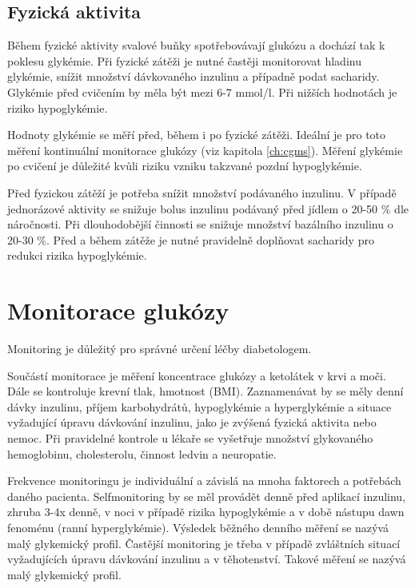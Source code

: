 \subsection{Fyzická aktivita}

Během fyzické aktivity svalové buňky spotřebovávají glukózu a dochází tak k poklesu glykémie. Při fyzické zátěži je nutné častěji monitorovat hladinu glykémie, snížit množství dávkovaného inzulinu a případně podat sacharidy. Glykémie před cvičením by měla být mezi 6-7 mmol/l. Při nižších hodnotách je riziko hypoglykémie.

Hodnoty glykémie se měří před, během i po fyzické zátěži. Ideální je pro toto měření kontinuální monitorace glukózy (viz kapitola \ref{ch:cgms}). Měření glykémie po cvičení je důležité kvůli riziku vzniku takzvané pozdní hypoglykémie.

Před fyzickou zátěží je potřeba snížit množství podávaného inzulinu. V případě jednorázové aktivity se snižuje bolus inzulinu podávaný před jídlem o 20-50 \% dle náročnosti. Při dlouhodobější činnosti se snižuje množství bazálního inzulinu o 20-30 \%. Před a během zátěže je nutné pravidelně doplňovat sacharidy pro redukci rizika hypoglykémie.


\section{Monitorace glukózy}
\label{ch:monitorace}

Monitoring je důležitý pro správné určení léčby diabetologem.

Součástí monitorace je měření koncentrace glukózy a ketolátek v krvi a moči. Dále se kontroluje krevní tlak, hmotnost (BMI). Zaznamenávat by se měly denní dávky inzulinu, příjem karbohydrátů, hypoglykémie a hyperglykémie a situace vyžadující úpravu dávkování inzulinu, jako je zvýšená fyzická aktivita nebo nemoc. Při pravidelné kontrole u lékaře se vyšetřuje množství glykovaného hemoglobinu, cholesterolu, činnost ledvin a neuropatie.

Frekvence monitoringu je individuální a závislá na mnoha faktorech a potřebách daného pacienta. Selfmonitoring by se měl provádět denně před aplikací inzulinu, zhruba 3-4x denně, v noci v případě rizika hypoglykémie a v době nástupu dawn fenoménu (ranní hyperglykémie). Výsledek běžného denního měření se nazývá malý glykemický profil. Častější monitoring je třeba v případě zvláštních situací vyžadujících úpravu dávkování inzulinu a v těhotenství. Takové měření se nazývá malý glykemický profil.

